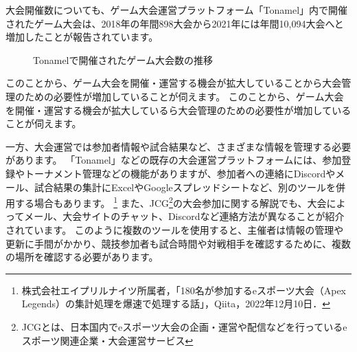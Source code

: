 大会開催数についても、ゲーム大会運営プラットフォーム「Tonamel」内で開催されたゲーム大会は、2018年の年間898大会から2021年には年間10,094大会へと増加したことが報告されています。\cite{kayakku}

\begin{figure}[htbp]
\centering


\caption{Tonamelで開催されたゲーム大会数の推移}

\end{figure}



このことから、ゲーム大会を開催・運営する機会が拡大していることから大会管理のための必要性が増加していることが伺えます。 このことから、ゲーム大会を開催・運営する機会が拡大しているら大会管理のための必要性が増加していることが伺えます。



一方、大会運営では参加者情報や試合結果など、さまざまな情報を管理する必要があります。
「Tonamel」などの既存の大会運営プラットフォームには、参加登録やトーナメント管理などの機能がありますが、参加者への連絡にDiscordやメール、試合結果の集計にExcelやGoogleスプレッドシートなど、別のツールを併用する場合もあります。
\footnote[1]{株式会社エイプリルナイツ所属者，「180名が参加するeスポーツ大会（Apex Legends）の集計処理を爆速で処理する話」，Qiita，2022年12月10日． }
また、JCG\footnote[2]{JCGとは、日本国内でeスポーツ大会の企画・運営や配信などを行っているeスポーツ関連企業・大会運営サービス}の大会参加に関する解説でも、大会によってメール、大会サイトのチャット、Discordなど連絡方法が異なることが紹介されています。
このように複数のツールを使用すると、主催者は情報の管理や更新に手間がかかり、競技参加者も試合時間や対戦相手を確認するために、複数の場所を確認する必要があります。

